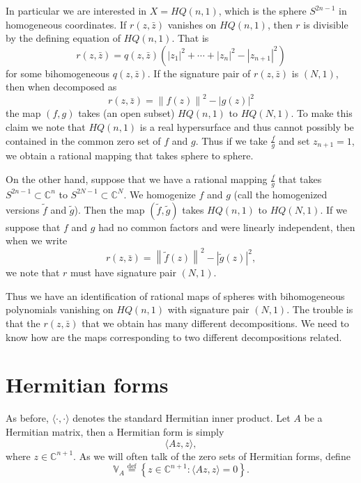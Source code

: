 \documentclass[12pt,openany]{book}
\newcommand{\abs}[1]{\left\lvert {#1} \right\rvert}
\newcommand{\norm}[1]{\left\lVert {#1} \right\rVert}
\newcommand{\C}{{\mathbb{C}}}
\newcommand{\bV}{{\mathbb{V}}}
\theoremstyle{plain}
\theoremstyle{remark}
\theoremstyle{definition}
\theoremstyle{exercise}
\theoremstyle{example}
\begin{document}
In particular we are interested in $X = HQ(n,1)$, which is the sphere
$S^{2n-1}$ in homogeneous coordinates.  If $r(z,\bar{z})$ vanishes
on $HQ(n,1)$, then $r$ is divisible by the defining equation of $HQ(n,1)$.
That is
\begin{equation}
r(z,\bar{z}) = q(z,\bar{z})
\left( \abs{z_1}^2 + \cdots + \abs{z_n}^2 - \abs{z_{n+1}}^2 \right)
\end{equation}
for some bihomogeneous $q(z,\bar{z})$.  If the signature pair of
$r(z,\bar{z})$ is $(N,1)$, then when decomposed as
\begin{equation}
r(z,\bar{z}) = 
\norm{f(z)}^2 - \abs{g(z)}^2
\end{equation}
the map $(f,g)$ takes (an open subset) $HQ(n,1)$ to $HQ(N,1)$.  To
make this claim we note that $HQ(n,1)$ is a real hypersurface and thus cannot
possibly be contained in the common zero set of $f$ and $g$.
Thus if we take $\frac{f}{g}$ and set $z_{n+1} = 1$, we obtain a rational
mapping that takes sphere to sphere.

On the other hand, suppose that we have a rational mapping $\frac{f}{g}$
that takes
$S^{2n-1} \subset \C^n$ to $S^{2N-1} \subset \C^N$.  We homogenize $f$ and
$g$ (call the homogenized versions $\tilde{f}$ and $\tilde{g}$).  Then
the map $(\tilde{f},\tilde{g})$ takes $HQ(n,1)$ to $HQ(N,1)$.
If we suppose that $f$ and $g$ had no common factors and were linearly
independent, then when we write
\begin{equation}
r(z,\bar{z}) = \norm{\tilde{f}(z)}^2 - \abs{\tilde{g}(z)}^2,
\end{equation}
we note that $r$ must have signature pair $(N,1)$.

Thus we have an identification of rational maps of spheres with bihomogeneous
polynomials vanishing on $HQ(n,1)$ with signature pair $(N,1)$.  The trouble
is that the $r(z,\bar{z})$ that we obtain has many different decompositions.
We need to know how are the maps corresponding to two different
decompositions related.


\section{Hermitian forms} \label{section:hermforms}

As before, $\langle \cdot , \cdot \rangle$ denotes the standard
Hermitian inner product.
Let $A$ be a Hermitian matrix, then a Hermitian form is simply
\begin{equation}
\langle A z , z \rangle ,
\end{equation}
where $z \in \C^{n+1}$.
As we will often talk of the zero sets of Hermitian forms,
define
\begin{equation}
\bV_A \overset{\text{def}}{=}
\left\{ z \in \C^{n+1} :
\langle A z , z \rangle = 0 \right\} .
\end{equation}
\end{document}
